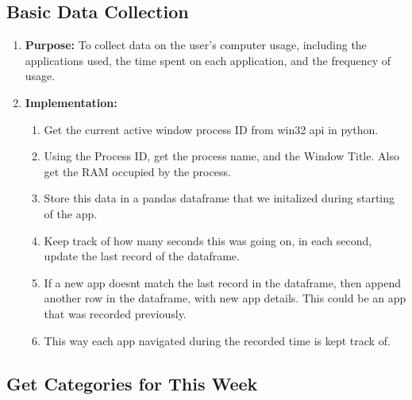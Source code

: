 \documentclass[openany]{report}
\begin{document}
\subsection{Basic Data Collection}
\begin{enumerate}
    \item \textbf{Purpose:} To collect data on the user's computer usage, including the applications used, the time spent on each application, and the frequency of usage.
    \item \textbf{Implementation:}
          \begin{enumerate}
              \item Get the current active window process ID from win32 api in python.
              \item Using the Process ID, get the process name, and the Window Title. Also get the RAM occupied by the process.
              \item Store this data in a pandas dataframe that we initalized during starting of the app.
              \item Keep track of how many seconds this was going on, in each second, update the last record of the dataframe.
              \item If a new app doesnt match the last record in the dataframe, then append another row in the dataframe, with new app details. This could be an app that was recorded previously.
              \item This way each app navigated during the recorded time is kept track of.
          \end{enumerate}
\end{enumerate}

\subsection{Get Categories for This Week}
\end{document}
